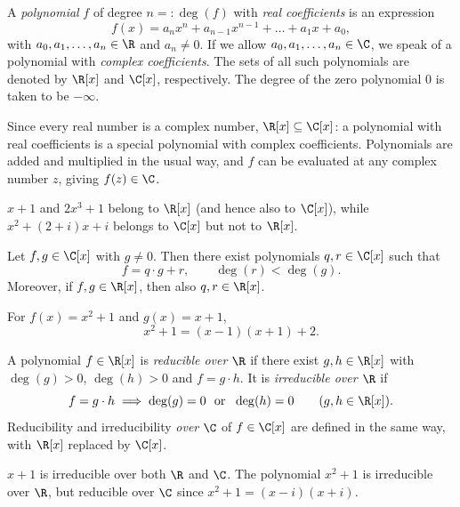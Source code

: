 \begin{definition}
A \emph{polynomial} $f$ of degree $n=:\deg(f)$ with \emph{real coefficients} is an expression
\[
f(x) = a_n x^n + a_{n-1}x^{n-1}+\ldots + a_1 x + a_0,
\]
with $a_0,a_1,\ldots,a_n\in \R$ and $a_n\neq 0$. If we allow $a_0,a_1,\ldots,a_n\in\C$, we speak of a
polynomial with \emph{complex coefficients}. The sets of all such polynomials are denoted by $\R[x]$ and
$\C[x]$, respectively. The degree of the zero polynomial $0$ is taken to be $-\infty$.
\end{definition}

\noindent Since every real number is a complex number, $\R[x]\subseteq\C[x]$: a polynomial with real
coefficients is a special polynomial with complex coefficients. Polynomials are added and multiplied in the
usual way, and $f$ can be evaluated at any complex number $z$, giving $f(z)\in\C$.

\begin{example}
$x+1$ and $2x^3+1$ belong to $\R[x]$ (and hence also to $\C[x]$), while $x^2+(2+i)x+i$ belongs to $\C[x]$
but not to $\R[x]$.
\end{example}

\begin{fact}
Let $f,g\in\C[x]$ with $g\neq 0$. Then there exist polynomials $q,r\in \C[x]$ such that
\[
f = q\cdot g + r, \qquad \deg(r)<\deg(g).
\]
Moreover, if $f,g\in\R[x]$, then also $q,r\in\R[x]$.
\end{fact}

\begin{example}
For $f(x) = x^2+1$ and $g(x) = x+1$,
\[
x^2+1 = (x-1)(x+1)+2.
\]
\end{example}

\begin{definition}
A polynomial $f\in \R[x]$ is \emph{reducible over $\R$} if there exist $g,h\in \R[x]$ with $\deg(g)>0$,
$\deg(h)>0$ and $f=g\cdot h$. It is \emph{irreducible over $\R$} if
\[
f = g\cdot h \implies \deg(g)=0 \ \text{ or } \ \deg(h)=0 \qquad (g,h\in\R[x]).
\]
Reducibility and irreducibility \emph{over $\C$} of $f\in\C[x]$ are defined in the same way, with $\R[x]$
replaced by $\C[x]$.
\end{definition}

\begin{example}
$x+1$ is irreducible over both $\R$ and $\C$. The polynomial $x^2+1$ is irreducible over $\R$, but reducible
over $\C$ since $x^2+1 = (x-i)(x+i)$.
\end{example}

